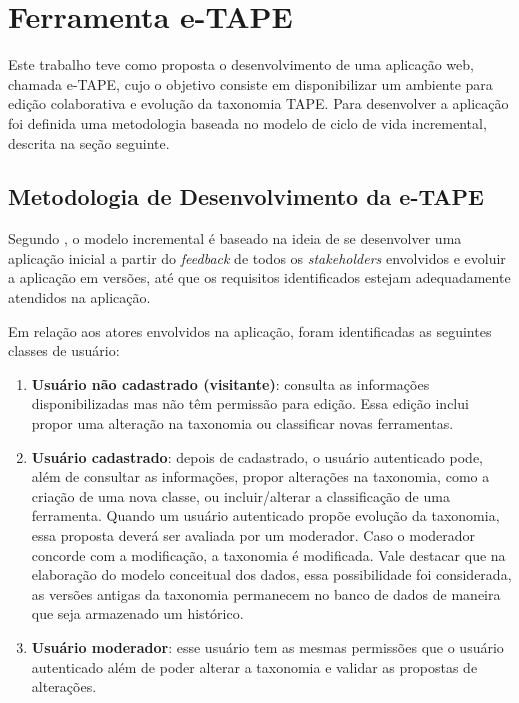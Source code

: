 \chapter[Ferramenta]{Ferramenta e-TAPE}
\label{cap:cap3}
Este trabalho teve como proposta o desenvolvimento de uma aplicação web, chamada e-TAPE, cujo o objetivo consiste em disponibilizar um ambiente para edição colaborativa e evolução da taxonomia TAPE.
Para desenvolver a aplicação foi definida uma metodologia baseada no modelo de ciclo de vida incremental, descrita na seção seguinte.

\section {Metodologia de Desenvolvimento da e-TAPE}
\label{sec:desenvolvimento}
\par
Segundo , o modelo incremental é baseado na ideia de se desenvolver uma aplicação inicial a partir do \textit{feedback} de todos os \textit{stakeholders} envolvidos e evoluir a aplicação em versões, até que os requisitos identificados estejam adequadamente atendidos na aplicação. 

\par
Em relação aos atores envolvidos na aplicação, foram identificadas as seguintes classes de usuário:
\begin{enumerate}
    \item \textbf{Usuário não cadastrado (visitante)}: consulta as informações disponibilizadas mas não têm permissão para edição. Essa edição inclui propor uma alteração na taxonomia ou classificar novas ferramentas.
    \item \textbf{Usuário cadastrado}: depois de cadastrado, o usuário autenticado pode, além de consultar as informações, propor alterações na taxonomia,  como a criação de uma nova classe, ou incluir/alterar a
    classificação de uma ferramenta. Quando um usuário autenticado propõe evolução da taxonomia, essa proposta deverá ser avaliada por um moderador. Caso o moderador concorde com a modificação,  a taxonomia é modificada. Vale destacar que na elaboração do modelo conceitual dos dados, essa possibilidade foi considerada, as versões antigas da taxonomia permanecem no banco de dados de maneira que seja armazenado
    um histórico. 
    \item \textbf{Usuário moderador}: esse usuário tem as mesmas permissões que o usuário autenticado além de poder alterar a taxonomia e validar as propostas de alterações. 
\end{enumerate}

